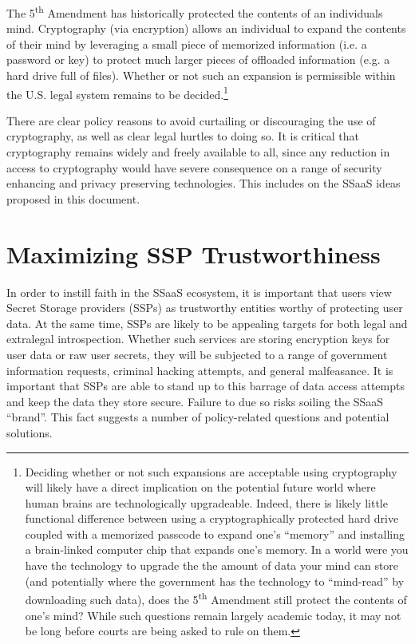 The 5\textsuperscript{th} Amendment has historically protected the
contents of an individuals mind. Cryptography (via encryption) allows
an individual to expand the contents of their mind by leveraging a
small piece of memorized information (i.e. a password or key) to
protect much larger pieces of offloaded information (e.g. a hard drive
full of files). Whether or not such an expansion is permissible within
the U.S. legal system remains to be decided.\footnote{Deciding whether
  or not such expansions are acceptable using cryptography will likely
  have a direct implication on the potential future world where human
  brains are technologically upgradeable. Indeed, there is likely
  little functional difference between using a cryptographically
  protected hard drive coupled with a memorized passcode to expand
  one's ``memory'' and installing a brain-linked computer chip that
  expands one's memory. In a world were you have the technology to
  upgrade the the amount of data your mind can store (and potentially
  where the government has the technology to ``mind-read'' by
  downloading such data), does the 5\textsuperscript{th} Amendment
  still protect the contents of one's mind? While such questions
  remain largely academic today, it may not be long before courts are
  being asked to rule on them.}

There are clear policy reasons to avoid curtailing or discouraging the
use of cryptography, as well as clear legal hurtles to doing so. It is
critical that cryptography remains widely and freely available to all,
since any reduction in access to cryptography would have severe
consequence on a range of security enhancing and privacy preserving
technologies. This includes on the SSaaS ideas proposed in this
document.

\section{Maximizing SSP Trustworthiness}

In order to instill faith in the SSaaS ecosystem, it is important that
users view Secret Storage providers (SSPs) as trustworthy entities
worthy of protecting user data. At the same time, SSPs are likely to
be appealing targets for both legal and extralegal introspection.
Whether such services are storing encryption keys for user data or raw
user secrets, they will be subjected to a range of government
information requests, criminal hacking attempts, and general
malfeasance. It is important that SSPs are able to stand up to this
barrage of data access attempts and keep the data they store
secure. Failure to due so risks soiling the SSaaS ``brand''. This fact
suggests a number of policy-related questions and potential solutions.

